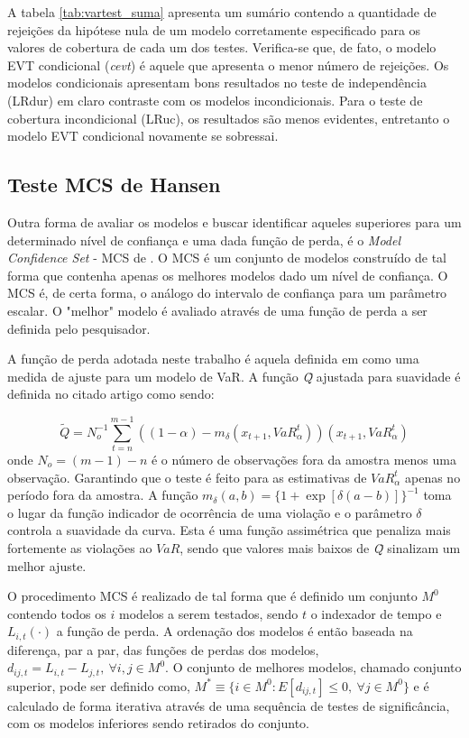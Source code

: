 \documentclass[1p]{elsarticle}
\theoremstyle{definition}
\begin{document}
A tabela \ref{tab:vartest_suma} apresenta um sumário contendo a quantidade de rejeições da hipótese nula de um modelo corretamente especificado para os valores de cobertura de cada um dos testes. Verifica-se que, de fato, o modelo EVT condicional (\emph{cevt}) é aquele que apresenta o menor número de rejeições. Os modelos condicionais apresentam bons resultados no teste de independência (LRdur) em claro contraste com os modelos incondicionais. Para o teste de cobertura incondicional (LRuc), os resultados são menos evidentes, entretanto o modelo EVT condicional novamente se sobressai.



\subsection{Teste MCS de Hansen}
\label{sec:mcs}

Outra forma de avaliar os modelos e buscar identificar aqueles superiores para um determinado nível de confiança e uma dada função de perda, é o \emph{Model Confidence Set} - MCS de \cite{Hansen2011}. O MCS é um conjunto de modelos construído de tal forma que contenha apenas os melhores modelos dado um nível de confiança. O MCS é, de certa forma, o análogo do intervalo de confiança para um parâmetro escalar. O "melhor" modelo é avaliado através de uma função de perda a ser definida pelo pesquisador.

A função de perda adotada neste trabalho é aquela definida em \cite{Gonzalez-Rivera2004} como uma medida de ajuste para um modelo de VaR. A função \emph{\~{Q}} ajustada para suavidade é definida no citado artigo como sendo:

\begin{equation}
	\tilde{Q} = N_o^{-1}\sum_{t=n}^{m-1}((1-\alpha)-m_\delta(x_{t+1}, VaR^t_\alpha))(x_{t+1}, VaR^t_\alpha)
\end{equation}
onde $N_o = (m-1)-n$ é o número de observações fora da amostra menos uma observação. Garantindo que o teste é feito para as estimativas de $VaR^t_\alpha$ apenas no período fora da amostra. A função $m_\delta(a, b)=\{1+\exp[\delta(a-b)]\}^{-1}$ toma o lugar da função indicador de ocorrência de uma violação e o parâmetro $\delta$ controla a suavidade da curva. Esta é uma função assimétrica que penaliza mais fortemente as violações ao $VaR$, sendo que valores mais baixos de \emph{\~{Q}} sinalizam um melhor ajuste.

O procedimento MCS é realizado de tal forma que é definido um conjunto $M^0$ contendo todos os $i$ modelos a serem testados, sendo $t$ o indexador de tempo e $L_{i, t}(\cdot)$ a função de perda. A ordenação dos modelos é então baseada na diferença, par a par, das funções de perdas dos modelos, $d_{ij, t} = L_{i, t}-L_{j, t}, \ \forall i,j \in M^0$. O conjunto de melhores modelos, chamado conjunto superior, pode ser definido como, $M^\ast \equiv \{i \in M^0 : E[d_{ij,t}] \leq 0, \ \forall j \in M^0\}$ e é calculado de forma iterativa através de uma sequência de testes de significância, com os modelos inferiores sendo retirados do conjunto.
\end{document}
